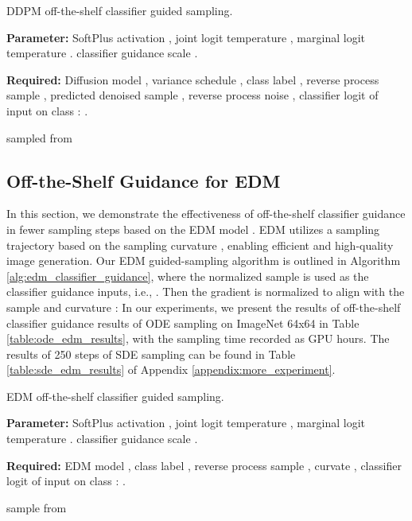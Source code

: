 \documentclass{article}
\theoremstyle{definition}
\begin{document}
\begin{algorithm}
\caption{DDPM off-the-shelf classifier guided sampling.}\label{alg:ddpm_guidance}
\begin{algorithmic}

\State \textbf{Parameter:} SoftPlus activation , joint logit temperature , marginal logit temperature . classifier guidance scale .

\State \textbf{Required:} Diffusion model , variance schedule , class label , reverse process sample , predicted denoised sample , reverse process noise , classifier logit of input  on class : . 

\State  sampled from  
\For{ }  
\State 
\State        {}
\State  {}
\State 
\EndFor 
\State \Return 
\end{algorithmic}
\end{algorithm}


\subsection{Off-the-Shelf Guidance for EDM}
In this section, we demonstrate the effectiveness of off-the-shelf classifier guidance in fewer sampling steps based on the EDM model \citep{karras2022edm}. 
EDM utilizes a sampling trajectory based on the sampling curvature , enabling efficient and high-quality image generation. Our EDM guided-sampling algorithm is outlined in Algorithm \ref{alg:edm_classifier_guidance}, where the normalized sample  is used as the classifier guidance inputs, i.e., . Then the gradient  is normalized to align with the sample  and curvature :  In our experiments, we present the results of off-the-shelf classifier guidance results of ODE sampling on ImageNet 64x64 in Table \ref{table:ode_edm_results}, with the sampling time recorded as GPU hours. The results of 250 steps of SDE sampling \citep{kingma2023variational} can be found in Table \ref{table:sde_edm_results} of Appendix \ref{appendix:more_experiment}.


\begin{algorithm}
\caption{EDM off-the-shelf classifier guided sampling.}\label{alg:edm_classifier_guidance}

\begin{algorithmic}
\State \textbf{Parameter:} SoftPlus activation , joint logit temperature , marginal logit temperature . classifier guidance scale .

\State \textbf{Required:} EDM model , class label , reverse process sample , curvate , classifier logit of input  on class : . 

\State  sample from  
\For{ }  

\State   

\State 
{}
\State 
\State  {}

\If{}
    \State 
\EndIf

\EndFor 
\State \Return 
\end{algorithmic}
\end{algorithm}
\end{document}
